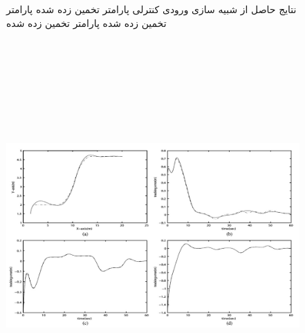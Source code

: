\begin{figure}[h]
\begin{center}
{			\label{3C-a3}
		}
		\hspace*{0.2cm}
	\end{center}
	\caption{
		نتایج حاصل از شبیه سازی
		 ورودی کنترلی
		 پارامتر تخمین زده شده
		 پارامتر تخمین زده شده
		 پارامتر تخمین زده شده
	}
\end{figure}
\begin{figure}[h]
	\centering
	\includegraphics[height=15cm,width=15cm]{img/article_result1}
\end{figure}
